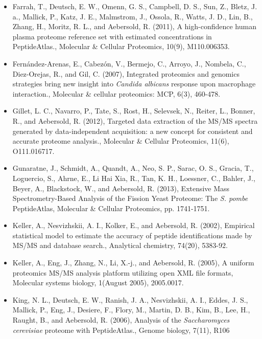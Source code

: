 \begin{itemize}
\item[]{
Farrah, T., Deutsch, E. W., Omenn, G. S., Campbell, D. S., Sun, Z., Bletz, J. a., Mallick, P., Katz,
J. E., Malmstrom, J., Ossola, R., Watts, J. D., Lin, B., Zhang, H., Moritz, R. L., 
and Aebersold, R. (2011), A high-confidence human plasma proteome reference set with estimated
concentrations in PeptideAtlas., Molecular \& Cellular Proteomics, 10(9), M110.006353.
}

\item[]{
Fern\'andez-Arenas, E., Cabez\'on, V., Bermejo, C., Arroyo, J., Nombela, C., Diez-Orejas, R.,
and Gil, C. (2007), Integrated proteomics and genomics strategies bring new insight into
\textit{Candida albicans} response upon macrophage interaction., 
Molecular \& cellular proteomics: MCP, 6(3), 460-478.
}

\item[]{
Gillet, L. C., Navarro, P., Tate, S., Rost, H., Selevsek, N., Reiter, L., Bonner, R., and Aebersold,
R. (2012), Targeted data extraction of the MS/MS spectra generated by data-independent
acquisition: a new concept for consistent and accurate proteome analysis., Molecular \&
Cellular Proteomics, 11(6), O111.016717.
}

\item[]{
Gunaratne, J., Schmidt, A., Quandt, A., Neo, S. P., Sarac, O. S., Gracia, T., Loguercio, S.,
Ahrne, E., Li Hai Xia, R., Tan, K. H., Loessner, C., Bahler, J., Beyer, A., Blackstock, W., and
Aebersold, R. (2013), Extensive Mass Spectrometry-Based Analysis of the Fission Yeast
Proteome: The \textit{S. pombe} PeptideAtlas, Molecular \& Cellular Proteomics, pp. 1741-1751.
}

\item[]{
Keller, A., Nesvizhskii, A. I., Kolker, E., and Aebersold, R. (2002), Empirical statistical model
to estimate the accuracy of peptide identifications made by MS/MS and database search.,
Analytical chemistry, 74(20), 5383-92.
}

\item[]{
Keller, A., Eng, J., Zhang, N., Li, X.-j., and Aebersold, R. (2005), A uniform proteomics MS/MS
analysis platform utilizing open XML file formats, Molecular systems biology, 1(August
2005), 2005.0017.
}

\item[]{
King, N. L., Deutsch, E. W., Ranish, J. A., Nesvizhskii, A. I., Eddes, J. S., Mallick, P., Eng, J.,
Desiere, F., Flory, M., Martin, D. B., Kim, B., Lee, H., Raught, B., and Aebersold, R. (2006),
Analysis of the \textit{Saccharomyces cerevisiae} proteome with PeptideAtlas., Genome biology,
7(11), R106
}


\end{itemize}
